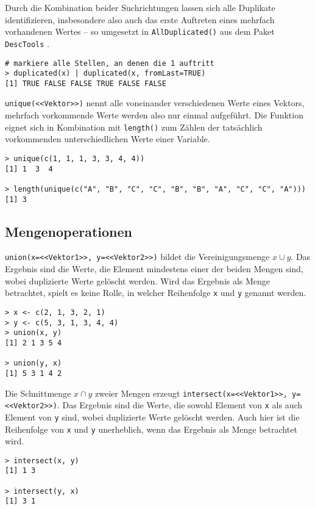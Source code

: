 Durch die Kombination beider Suchrichtungen lassen sich alle Duplikate identifizieren, insbesondere also auch das erste Auftreten eines mehrfach vorhandenen Wertes -- so umgesetzt in  \lstinline!AllDuplicated()! aus dem Paket \lstinline!DescTools! \cite{Signorell2014}.
\begin{lstlisting}
# markiere alle Stellen, an denen die 1 auftritt
> duplicated(x) | duplicated(x, fromLast=TRUE)
[1] TRUE FALSE FALSE TRUE FALSE FALSE
\end{lstlisting}

\lstinline!unique(<<Vektor>>)! nennt alle voneinander verschiedenen Werte eines Vektors, mehrfach vorkommende Werte werden also nur einmal aufgeführt. Die Funktion eignet sich in Kombination mit \lstinline!length()! zum Zählen der tatsächlich vorkommenden unterschiedlichen Werte einer Variable.
\begin{lstlisting}
> unique(c(1, 1, 1, 3, 3, 4, 4))
[1] 1  3  4

> length(unique(c("A", "B", "C", "C", "B", "B", "A", "C", "C", "A")))
[1] 3
\end{lstlisting}

\subsection{Mengenoperationen}
\label{sec:setOps}

\lstinline!union(x=<<Vektor1>>, y=<<Vektor2>>)! bildet die Vereinigungsmenge $x \cup y$. Das Ergebnis sind die Werte, die Element mindestens einer der beiden Mengen sind, wobei duplizierte Werte gelöscht werden. Wird das Ergebnis als Menge betrachtet, spielt es keine Rolle, in welcher Reihenfolge \lstinline!x! und \lstinline!y! genannt werden.
\begin{lstlisting}
> x <- c(2, 1, 3, 2, 1)
> y <- c(5, 3, 1, 3, 4, 4)
> union(x, y)
[1] 2 1 3 5 4

> union(y, x)
[1] 5 3 1 4 2
\end{lstlisting}

Die Schnittmenge $x \cap y$ zweier Mengen erzeugt \lstinline!intersect(x=<<Vektor1>>, y=<<Vektor2>>)!. Das Ergebnis sind die Werte, die sowohl Element von \lstinline!x! als auch Element von \lstinline!y! sind, wobei duplizierte Werte gelöscht werden. Auch hier ist die Reihenfolge von \lstinline!x! und \lstinline!y! unerheblich, wenn das Ergebnis als Menge betrachtet wird.
\begin{lstlisting}
> intersect(x, y)
[1] 1 3

> intersect(y, x)
[1] 3 1
\end{lstlisting}

